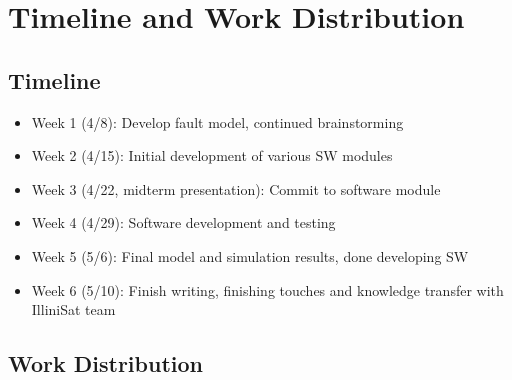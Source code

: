 \section{Timeline and Work Distribution}
\subsection{Timeline}
\begin{itemize}
  \item Week 1 (4/8): Develop fault model, continued brainstorming
  \item Week 2 (4/15): Initial development of various SW modules
  \item Week 3 (4/22, midterm presentation): Commit to software module
  \item Week 4 (4/29): Software development and testing
  \item Week 5 (5/6): Final model and simulation results, done developing SW
  \item Week 6 (5/10): Finish writing, finishing touches and knowledge transfer
  with IlliniSat team
\end{itemize}
\subsection{Work Distribution}
